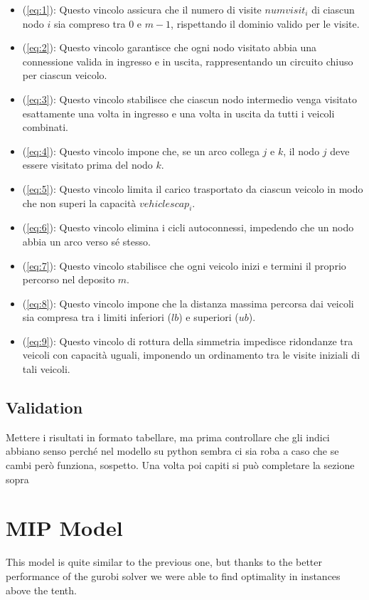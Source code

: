 \documentclass{article}
\begin{document}
\begin{itemize}
	\item (\ref{eq:1}): Questo vincolo assicura che il numero di visite \(numvisit_i\) di ciascun nodo \(i\) sia compreso tra 0 e \(m-1\), rispettando il dominio valido per le visite.
	\item (\ref{eq:2}): Questo vincolo garantisce che ogni nodo visitato abbia una connessione valida in ingresso e in uscita, rappresentando un circuito chiuso per ciascun veicolo.
	\item (\ref{eq:3}): Questo vincolo stabilisce che ciascun nodo intermedio venga visitato esattamente una volta in ingresso e una volta in uscita da tutti i veicoli combinati.
	\item (\ref{eq:4}): Questo vincolo impone che, se un arco collega \(j\) e \(k\), il nodo \(j\) deve essere visitato prima del nodo \(k\).
	\item (\ref{eq:5}): Questo vincolo limita il carico trasportato da ciascun veicolo in modo che non superi la capacità \(vehiclescap_i\).
	\item (\ref{eq:6}): Questo vincolo elimina i cicli autoconnessi, impedendo che un nodo abbia un arco verso sé stesso.
	\item (\ref{eq:7}): Questo vincolo stabilisce che ogni veicolo inizi e termini il proprio percorso nel deposito \(m\).
	\item (\ref{eq:8}): Questo vincolo impone che la distanza massima percorsa dai veicoli sia compresa tra i limiti inferiori (\(lb\)) e superiori (\(ub\)).
	\item (\ref{eq:9}): Questo vincolo di rottura della simmetria impedisce ridondanze tra veicoli con capacità uguali, imponendo un ordinamento tra le visite iniziali di tali veicoli.
\end{itemize}

\subsection{Validation}
Mettere i risultati in formato tabellare, ma prima controllare che gli indici abbiano senso perché nel modello su python sembra ci sia roba a caso che se cambi però funziona, sospetto. Una volta poi capiti si può completare la sezione sopra
\section{MIP Model}
This model is quite similar to the previous one, but thanks to the better performance of the gurobi solver we were able to find optimality in instances above the tenth.
\end{document}
